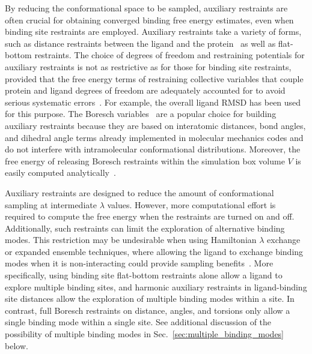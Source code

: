 \documentclass[9pt,bestpractices]{livecoms}
\begin{document}
By reducing the conformational space to be sampled, auxiliary restraints are often crucial for obtaining converged binding free energy estimates, even when binding site restraints are employed.
Auxiliary restraints take a variety of forms, such as distance restraints between the ligand and the protein~\cite{mobley2006use,clark2023comparison} as well as flat-bottom restraints. The choice of degrees of freedom and restraining potentials for auxiliary restraints is not as restrictive as for those for binding site restraints, provided that the free energy terms of restraining collective variables that couple protein and ligand degrees of freedom are adequately accounted for to avoid serious systematic errors~\cite{clark2023comparison}.
For example, the overall ligand RMSD has been used~\cite{woo2005calculation} for this purpose.
The Boresch variables~\cite{boresch2003absolute,baumann2023broadening} are a popular choice for building auxiliary restraints because they are based on interatomic distances, bond angles, and dihedral angle terms already implemented in molecular mechanics codes and do not interfere with intramolecular conformational distributions. Moreover, the free energy of releasing Boresch restraints within the simulation box volume $V$ is easily computed analytically~\cite{boresch2003absolute, boresch2024analytical}.

Auxiliary restraints are designed to reduce the amount of conformational sampling at intermediate $\lambda$ values. However, more computational effort is required to compute the free energy when the restraints are turned on and off. Additionally, such restraints can limit the exploration of alternative binding modes. This restriction may be undesirable when using Hamiltonian $\lambda$ exchange or expanded ensemble techniques, where allowing the ligand to exchange binding modes when it is non-interacting could provide sampling benefits~\cite{wang2013identifying}.
More specifically, using binding site flat-bottom restraints alone allow a ligand to explore multiple binding sites, and harmonic auxiliary restraints in ligand-binding site distances allow the exploration of multiple binding modes within a site. In contrast, full Boresch restraints on distance, angles, and torsions only allow a single binding mode within a single site.
See additional discussion of the possibility of multiple binding modes in Sec.~\ref{sec:multiple_binding_modes} below.
\end{document}
